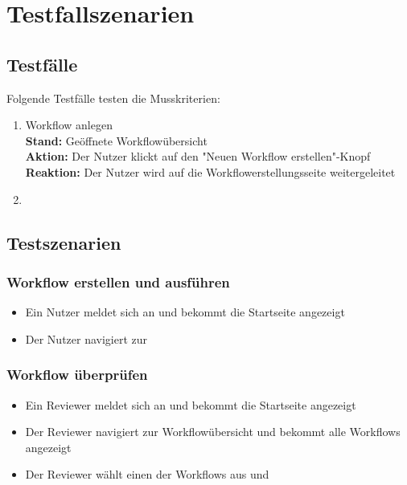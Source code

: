 \chapter{Testfallszenarien}

\section{Testfälle}
Folgende Testfälle testen die Musskriterien:
\renewcommand{\labelenumi}{/T\arabic{enumi}0/}
\begin{enumerate}
    \item Workflow anlegen \\ \textbf{Stand:} Geöffnete Workflowübersicht
    \\ \textbf{Aktion:} Der \Gls{Nutzer} klickt auf den "Neuen Workflow erstellen"-Knopf
    \\ \textbf{Reaktion:} Der \Gls{Nutzer} wird auf die Workflowerstellungsseite weitergeleitet
    \item 
\end{enumerate}

\section{Testszenarien}

\subsection*{Workflow erstellen und ausführen}
\begin{itemize}
    \item Ein \Gls{Nutzer} meldet sich an und bekommt die Startseite angezeigt
    \item Der \Gls{Nutzer} navigiert zur 
\end{itemize}

%
\subsection*{Workflow überprüfen}
\begin{itemize}
    \item Ein \Gls{Reviewer} meldet sich an und bekommt die Startseite angezeigt
    \item Der \Gls{Reviewer} navigiert zur Workflowübersicht und bekommt alle Workflows angezeigt
    \item Der \Gls{Reviewer} wählt einen der Workflows aus und 
\end{itemize}
